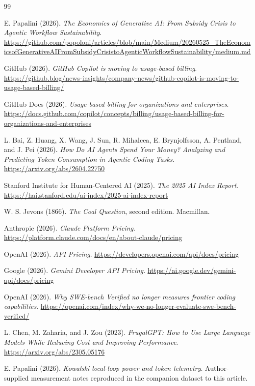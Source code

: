 \documentclass[11pt]{article}
\begin{document}
\begin{thebibliography}{99}

E. Papalini (2026).
\emph{The Economics of Generative AI: From Subsidy Crisis to Agentic Workflow Sustainability}.
\url{https://github.com/popoloni/articles/blob/main/Medium/20260525_TheEconomicsofGenerativeAIFromSubsidyCrisistoAgenticWorkflowSustainability/medium.md}

GitHub (2026).
\emph{GitHub Copilot is moving to usage-based billing}.
\url{https://github.blog/news-insights/company-news/github-copilot-is-moving-to-usage-based-billing/}

GitHub Docs (2026).
\emph{Usage-based billing for organizations and enterprises}.
\url{https://docs.github.com/copilot/concepts/billing/usage-based-billing-for-organizations-and-enterprises}

L. Bai, Z. Huang, X. Wang, J. Sun, R. Mihalcea, E. Brynjolfsson, A. Pentland, and J. Pei (2026).
\emph{How Do AI Agents Spend Your Money? Analyzing and Predicting Token Consumption in Agentic Coding Tasks}.
\url{https://arxiv.org/abs/2604.22750}

Stanford Institute for Human-Centered AI (2025).
\emph{The 2025 AI Index Report}.
\url{https://hai.stanford.edu/ai-index/2025-ai-index-report}

W. S. Jevons (1866).
\emph{The Coal Question}, second edition.
Macmillan.

Anthropic (2026).
\emph{Claude Platform Pricing}.
\url{https://platform.claude.com/docs/en/about-claude/pricing}

OpenAI (2026).
\emph{API Pricing}.
\url{https://developers.openai.com/api/docs/pricing}

Google (2026).
\emph{Gemini Developer API Pricing}.
\url{https://ai.google.dev/gemini-api/docs/pricing}

OpenAI (2026).
\emph{Why SWE-bench Verified no longer measures frontier coding capabilities}.
\url{https://openai.com/index/why-we-no-longer-evaluate-swe-bench-verified/}

L. Chen, M. Zaharia, and J. Zou (2023).
\emph{FrugalGPT: How to Use Large Language Models While Reducing Cost and Improving Performance}.
\url{https://arxiv.org/abs/2305.05176}

E. Papalini (2026).
\emph{Kowalski local-loop power and token telemetry}.
Author-supplied measurement notes reproduced in the companion dataset to this article.


\end{thebibliography}
\end{document}
